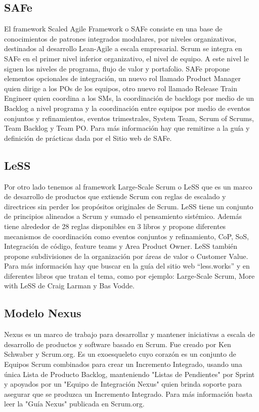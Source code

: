 \subsection{SAFe}

El framework Scaled Agile Framework o SAFe consiste en una base de conocimientos de patrones integrados modulares, por niveles organizativos, destinados al desarrollo Lean-Agile a escala empresarial. Scrum se integra en SAFe en el primer nivel inferior organizativo, el nivel de equipo. A este nivel le siguen los niveles de programa, flujo de valor y portafolio. SAFe propone elementos opcionales de integración, un nuevo rol llamado Product Manager quien dirige a los POs de los equipos, otro nuevo rol llamado Release Train Engineer quien coordina a los SMs, la coordinación de backlogs por medio de un Backlog a nivel programa y la coordinación entre equipos por medio de eventos conjuntos y refinamientos, eventos trimestrales, System Team, Scrum of Scrums, Team Backlog y Team PO. Para más información hay que remitirse a la guía y definición de prácticas dada por el Sitio web de SAFe.

\subsection{LeSS}

Por otro lado tenemos al framework Large-Scale Scrum o LeSS que  es un marco de desarrollo de productos que extiende Scrum con reglas de escalado y directrices sin perder los propósitos originales de Scrum. LeSS tiene un conjunto de principios alineados a Scrum y sumado el pensamiento sistémico. Además tiene alrededor de 28 reglas disponibles en 3 libros y propone diferentes mecanismos de coordinación como eventos conjuntos y refinamiento, CoP, SoS, Integración de código, feature teams y Area Product Owner. LeSS también propone subdivisiones de la organización por áreas de valor o Customer Value. Para más información hay que buscar en la guía del sitio web “less.works” y en diferentes libros que tratan el tema, como por ejemplo: Large-Scale Scrum, More with LeSS de Craig Larman y Bas Vodde.

\subsection{Modelo Nexus}

Nexus es un marco de trabajo para desarrollar y mantener iniciativas a escala de desarrollo de productos y software basado en Scrum. Fue creado por Ken Schwaber y Scrum.org. Es un exoesqueleto cuyo corazón es un conjunto de Equipos Scrum combinados para crear un Incremento Integrado, usando una única Lista de Producto Backlog, manteniendo "Listas de Pendientes" por Sprint y apoyados por un "Equipo de Integración Nexus" quien brinda soporte para asegurar que se produzca un Incremento Integrado. Para más información basta leer la "Guía Nexus" publicada en Scrum.org.

